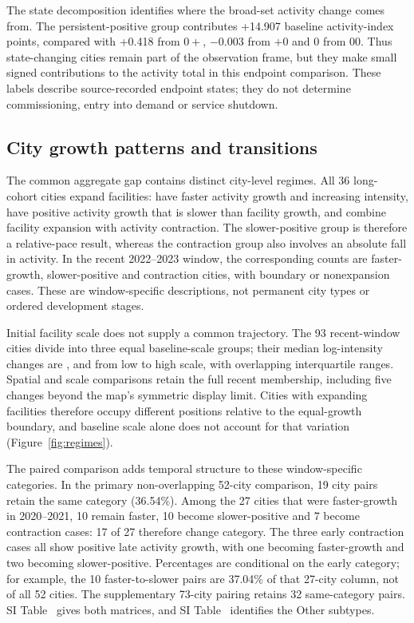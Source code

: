 The state decomposition identifies where the broad-set activity change comes from. The persistent-positive group contributes +14.907 baseline activity-index points, compared with +0.418 from $0+$, $-0.003$ from $+0$ and 0 from $00$. Thus state-changing cities remain part of the observation frame, but they make small signed contributions to the activity total in this endpoint comparison. These labels describe source-recorded endpoint states; they do not determine commissioning, entry into demand or service shutdown.


\subsection{City growth patterns and transitions}
The common aggregate gap contains distinct city-level regimes. All 36 long-cohort cities expand facilities: \LongFast{} have faster activity growth and increasing intensity, \LongSlow{} have positive activity growth that is slower than facility growth, and \LongContract{} combine facility expansion with activity contraction. The slower-positive group is therefore a relative-pace result, whereas the contraction group also involves an absolute fall in activity. In the recent 2022--2023 window, the corresponding counts are \RecentFast{} faster-growth, \RecentSlow{} slower-positive and \RecentContract{} contraction cities, with \RecentOther{} boundary or nonexpansion cases. These are window-specific descriptions, not permanent city types or ordered development stages.

Initial facility scale does not supply a common trajectory. The 93 recent-window cities divide into three equal baseline-scale groups; their median log-intensity changes are \SizeLowI, \SizeMiddleI{} and \SizeHighI{} from low to high scale, with overlapping interquartile ranges. Spatial and scale comparisons retain the full recent membership, including five changes beyond the map's symmetric display limit. Cities with expanding facilities therefore occupy different positions relative to the equal-growth boundary, and baseline scale alone does not account for that variation (Figure~\ref{fig:regimes}).




The paired comparison adds temporal structure to these window-specific categories. In the primary non-overlapping 52-city comparison, 19 city pairs retain the same category (36.54\%). Among the 27 cities that were faster-growth in 2020--2021, 10 remain faster, 10 become slower-positive and 7 become contraction cases: 17 of 27 therefore change category. The three early contraction cases all show positive late activity growth, with one becoming faster-growth and two becoming slower-positive. Percentages are conditional on the early category; for example, the 10 faster-to-slower pairs are 37.04\% of that 27-city column, not of all 52 cities. The supplementary 73-city pairing retains 32 same-category pairs. SI Table~ gives both matrices, and SI Table~ identifies the Other subtypes.

